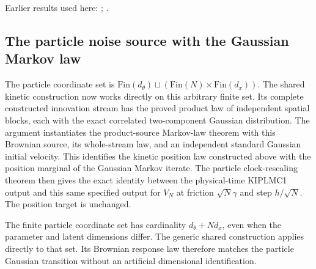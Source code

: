 \documentclass[11pt,a4paper]{report}
\begin{document}
Earlier results used here: \cite[Section~3.114]{LangevinLean2026Kinetic}; \cite[Section~3.57]{LangevinLean2026Kinetic}.
\subsection{\texorpdfstring{The particle noise source with the Gaussian Markov law}{The particle noise source with the Gaussian Markov law}}
\label{report-step-KIPLMC-CanonicalExponential-lean-1}


The particle coordinate set is \(\mathrm{Fin}(d_\theta)\sqcup(\mathrm{Fin}(N)\times\mathrm{Fin}(d_x))\). The shared kinetic construction now works directly on this arbitrary finite set. Its complete constructed innovation stream has the proved product law of independent spatial blocks, each with the exact correlated two-component Gaussian distribution. The argument instantiates the product-source Markov-law theorem with this Brownian source, its whole-stream law, and an independent standard Gaussian initial velocity. This identifies the kinetic position law constructed above with the position marginal of the Gaussian Markov iterate. The particle clock-rescaling theorem then gives the exact identity between the physical-time KIPLMC1 output and this same specified output for \(V_N\) at friction \(\sqrt N\gamma\) and step \(h/\sqrt N\). The position target is unchanged.



The finite particle coordinate set has cardinality \(d_\theta+Nd_x\), even when the parameter and latent dimensions differ. The generic shared construction applies directly to that set. Its Brownian response law therefore matches the particle Gaussian transition without an artificial dimensional identification.
\end{document}
